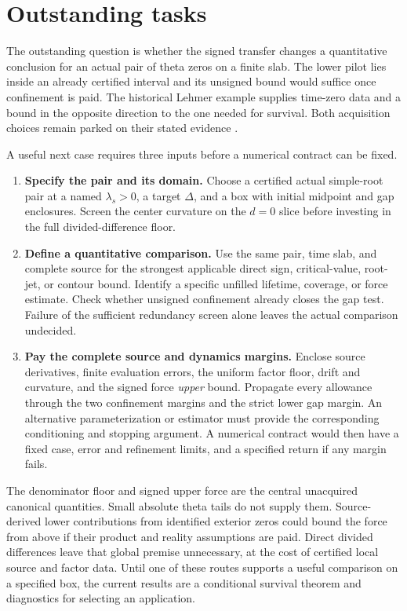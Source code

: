\section{Outstanding tasks}
\label{sec:outstanding}

The outstanding question is whether the signed transfer changes a
quantitative conclusion for an actual pair of theta zeros on a finite
slab. The lower pilot lies inside an already certified interval and
its unsigned bound would suffice once confinement is paid. The
historical Lehmer example supplies time-zero data and a bound in the
opposite direction to the one needed for survival. Both acquisition
choices remain parked on their stated evidence \cite{OARecord}.

A useful next case requires three inputs before a numerical contract
can be fixed.

\begin{enumerate}
\item \textbf{Specify the pair and its domain.}
Choose a certified actual simple-root pair at a named
\(\lambda_s>0\), a target \(\Delta\), and a box with initial midpoint
and gap enclosures. Screen the center curvature on the \(d=0\)
slice before investing in the full divided-difference floor.
\item \textbf{Define a quantitative comparison.}
Use the same pair, time slab, and complete source for the strongest
applicable direct sign, critical-value, root-jet, or contour bound.
Identify a specific unfilled lifetime, coverage, or force estimate.
Check whether unsigned confinement already closes the gap test.
Failure of the sufficient redundancy screen alone leaves the
actual comparison undecided.
\item \textbf{Pay the complete source and dynamics margins.}
Enclose source derivatives, finite evaluation errors, the uniform
factor floor, drift and curvature, and the signed force
\emph{upper} bound. Propagate every allowance through the two
confinement margins and the strict lower gap margin. An alternative
parameterization or estimator must provide the corresponding
conditioning and stopping argument. A numerical contract would
then have a fixed case, error and refinement limits, and a
specified return if any margin fails.
\end{enumerate}

The denominator floor and signed upper force are the central
unacquired canonical quantities. Small absolute theta tails do not
supply them. Source-derived lower contributions from identified
exterior zeros could bound the force from above if their product
and reality assumptions are paid. Direct divided differences leave
that global premise unnecessary, at the cost of certified local
source and factor data. Until one of these routes supports a
useful comparison on a specified box, the current results are a
conditional survival theorem and diagnostics for selecting an
application.
